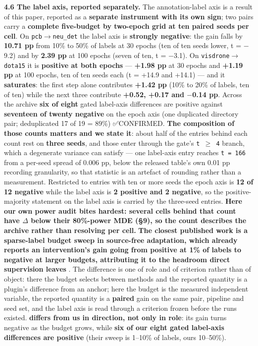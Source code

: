 \documentclass[pdflatex,sn-mathphys-ay]{sn-jnl}
\begin{document}
\textbf{4.6 The label axis, reported separately.} The annotation-label axis is a result of this paper, reported as a \textbf{separate instrument with its own sign}; two pairs carry a \textbf{complete five-budget by two-epoch grid at ten paired seeds per cell}. On \texttt{pcb\ensuremath{\rightarrow}neu\_det} the label axis is \textbf{strongly negative}: the gain falls by \textbf{10.71 pp} from 10\% to 50\% of labels at 30 epochs (ten of ten seeds lower, t = \ensuremath{-}9.2) and by \textbf{2.39 pp} at 100 epochs (seven of ten, t = \ensuremath{-}3.1). On \texttt{visdrone\ensuremath{\rightarrow}dota15} it is \textbf{positive at both epochs} --- \textbf{+1.98 pp} at 30 epochs and \textbf{+1.19 pp} at 100 epochs, ten of ten seeds each (t = +14.9 and +14.1) --- and it \textbf{saturates}: the first step alone contributes \textbf{+1.42 pp} (10\% to 20\% of labels, ten of ten) while the next three contribute \textbf{+0.52, +0.17 and \ensuremath{-}0.14 pp}. Across the archive \textbf{six of eight} gated label-axis differences are positive against \textbf{seventeen of twenty negative} on the epoch axis (one duplicated directory pair; deduplicated 17 of 19 = 89\%) ✅CONFIRMED. \textbf{The composition of those counts matters and we state it}: about half of the entries behind each count rest on \textbf{three seeds}, and those enter through the gate's \texttt{\textbar{}t\textbar{} \ensuremath{\geq} 4} branch, which a degenerate variance can satisfy --- one label-axis entry reaches \texttt{t = 166} from a per-seed spread of 0.006 pp, below the released table's own 0.01 pp recording granularity, so that statistic is an artefact of rounding rather than a measurement. Restricted to entries with ten or more seeds the epoch axis is \textbf{12 of 12 negative} while the label axis is \textbf{2 positive and 2 negative}, so the positive-majority statement on the label axis is carried by the three-seed entries. \textbf{Here our own power audit bites hardest: several cells behind that count have \textbar{}\ensuremath{\Delta}\textbar{} below their 80\%-power MDE (\S{}9), so the count describes the archive rather than resolving per cell.} \textbf{The closest published work is a sparse-label budget sweep in source-free adaptation, which already reports an intervention's gain going from positive at 1\% of labels to negative at larger budgets, attributing it to the headroom direct supervision leaves} \citep{zhang2026}. The difference is one of role and of criterion rather than of object: there the budget selects between methods and the reported quantity is a plugin's difference from an anchor; here the budget is the measured independent variable, the reported quantity is a \textbf{paired} gain on the same pair, pipeline and seed set, and the label axis is read through a criterion frozen before the runs existed. \textbf{\citep{zhang2026} differs from us in direction, not only in role}: its gain turns negative as the budget grows, while \textbf{six of our eight gated label-axis differences are positive} (their sweep is 1--10\% of labels, ours 10--50\%).
\end{document}
